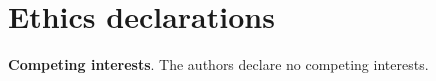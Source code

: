\documentclass[unnumsec,webpdf,contemporary,large]{oup-authoring-template}%
\theoremstyle{thmstyleone}%
\theoremstyle{thmstyletwo}%
\theoremstyle{thmstylethree}%
\begin{document}
\section*{Ethics declarations}

\textbf{Competing interests}. The authors declare no competing interests.











\end{document}
